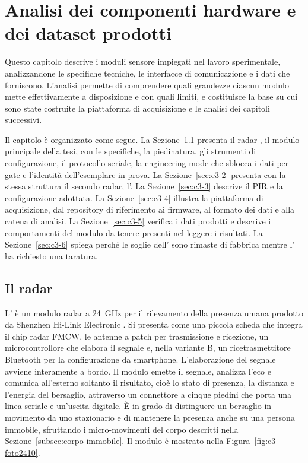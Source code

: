 \chapter{Analisi dei componenti hardware e dei dataset prodotti}
\label{chap:moduli}

Questo capitolo descrive i moduli sensore impiegati nel lavoro sperimentale, analizzandone le specifiche tecniche, le interfacce di comunicazione e i dati che forniscono. L'analisi permette di comprendere quali grandezze ciascun modulo mette effettivamente a disposizione e con quali limiti, e costituisce la base su cui sono state costruite la piattaforma di acquisizione e le analisi dei capitoli successivi.

Il capitolo è organizzato come segue. La Sezione~\ref{sec:c3-1} presenta il radar \ldb{}, il modulo principale della tesi, con le specifiche, la piedinatura, gli strumenti di configurazione, il protocollo seriale, la engineering mode che sblocca i dati per gate e l'identità dell'esemplare in prova. La Sezione~\ref{sec:c3-2} presenta con la stessa struttura il secondo radar, l'\ldc{}. La Sezione~\ref{sec:c3-3} descrive il PIR \pir{} e la configurazione adottata. La Sezione~\ref{sec:c3-4} illustra la piattaforma di acquisizione, dal repository di riferimento ai firmware, al formato dei dati e alla catena di analisi. La Sezione~\ref{sec:c3-5} verifica i dati prodotti e descrive i comportamenti del modulo da tenere presenti nel leggere i risultati. La Sezione~\ref{sec:c3-6} spiega perché le soglie dell'\ldb{} sono rimaste di fabbrica mentre l'\ldc{} ha richiesto una taratura.

\FloatBarrier
\section{Il radar \ldb{}}
\label{sec:c3-1}

L'\ldb{} è un modulo radar a 24~GHz per il rilevamento della presenza umana prodotto da Shenzhen Hi-Link Electronic \cite{hilinkManualV104}. Si presenta come una piccola scheda che integra il chip radar FMCW, le antenne a patch per trasmissione e ricezione, un microcontrollore che elabora il segnale e, nella variante B, un ricetrasmettitore Bluetooth per la configurazione da smartphone. L'elaborazione del segnale avviene interamente a bordo. Il modulo emette il segnale, analizza l'eco e comunica all'esterno soltanto il risultato, cioè lo stato di presenza, la distanza e l'energia del bersaglio, attraverso un connettore a cinque piedini che porta una linea seriale e un'uscita digitale. È in grado di distinguere un bersaglio in movimento da uno stazionario e di mantenere la presenza anche su una persona immobile, sfruttando i micro-movimenti del corpo descritti nella Sezione~\ref{subsec:corpo-immobile}. Il modulo è mostrato nella Figura~\ref{fig:c3-foto2410}.

